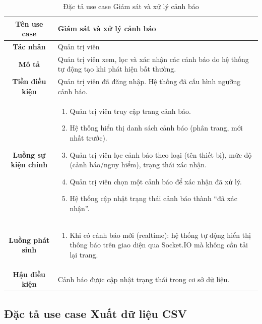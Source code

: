 \documentclass[../DoAn.tex]{subfiles}
\begin{document}
\begin{table}[H]
\centering
\caption{Đặc tả use case Giám sát và xử lý cảnh báo}
\label{table:uc_alert}
\small
\begin{tabularx}{\textwidth}{|c|X|}
\hline
\textbf{Tên use case} & Giám sát và xử lý cảnh báo \\
\hline
\textbf{Tác nhân} & Quản trị viên \\
\hline
\textbf{Mô tả} & Quản trị viên xem, lọc và xác nhận các cảnh báo do hệ thống tự động tạo khi phát hiện bất thường. \\
\hline
\textbf{Tiền điều kiện} & Quản trị viên đã đăng nhập. Hệ thống đã cấu hình ngưỡng cảnh báo. \\
\hline
\textbf{Luồng sự kiện chính} &
\begin{enumerate}[leftmargin=*, nosep]
    \item Quản trị viên truy cập trang cảnh báo.
    \item Hệ thống hiển thị danh sách cảnh báo (phân trang, mới nhất trước).
    \item Quản trị viên lọc cảnh báo theo loại (tên thiết bị), mức độ (cảnh báo/nguy hiểm), trạng thái xác nhận.
    \item Quản trị viên chọn một cảnh báo để xác nhận đã xử lý.
    \item Hệ thống cập nhật trạng thái cảnh báo thành ``đã xác nhận''.
\end{enumerate} \\
\hline
\textbf{Luồng phát sinh} &
\begin{enumerate}[leftmargin=*, nosep]
    \item[2a.] Khi có cảnh báo mới (realtime): hệ thống tự động hiển thị thông báo trên giao diện qua Socket.IO mà không cần tải lại trang.
\end{enumerate} \\
\hline
\textbf{Hậu điều kiện} & Cảnh báo được cập nhật trạng thái trong cơ sở dữ liệu. \\
\hline
\end{tabularx}
\end{table}

\subsection{Đặc tả use case Xuất dữ liệu CSV}
\label{subsection:2.3.5}
\end{document}
